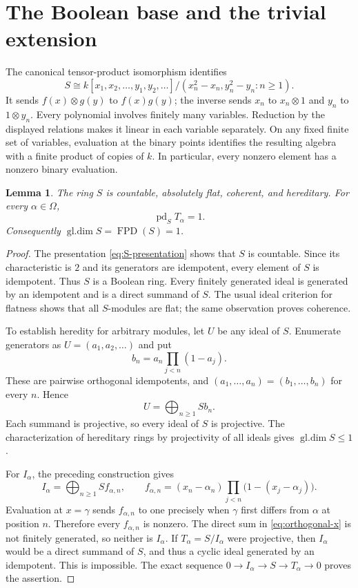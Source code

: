\documentclass[11pt]{amsart}
\newtheorem{lemma}[theorem]{Lemma}
\theoremstyle{definition}
\DeclareMathOperator{\FPD}{FPD}
\DeclareMathOperator{\pd}{pd}
\DeclareMathOperator{\gldim}{gl.dim}
\numberwithin{equation}{section}
\begin{document}
\section{The Boolean base and the trivial extension}

The canonical tensor-product isomorphism identifies
\begin{equation}\label{eq:S-presentation}
 S\cong k[x_1,x_2,\ldots,y_1,y_2,\ldots]/
 (x_n^2-x_n,y_n^2-y_n:n\geq1).
\end{equation}
It sends $f(x)\otimes g(y)$ to $f(x)g(y)$; the inverse sends
$x_n$ to $x_n\otimes1$ and $y_n$ to $1\otimes y_n$.
Every polynomial involves finitely many variables. Reduction by the
displayed relations makes it linear in each variable separately.
On any fixed finite set of variables, evaluation at the binary points
identifies the resulting algebra with a finite product of copies of
$k$. In particular, every nonzero element has a nonzero binary
evaluation.

\begin{lemma}\label{lem:hereditary}
The ring $S$ is countable, absolutely flat, coherent, and hereditary.
For every $\alpha\in\Omega$,
\[
 \pd_S T_\alpha=1.
\]
Consequently $\gldim S=\FPD(S)=1$.
\end{lemma}

\begin{proof}
The presentation \eqref{eq:S-presentation} shows that $S$ is countable.
Since its characteristic is $2$ and its generators are idempotent,
every element of $S$ is idempotent. Thus $S$ is a Boolean ring. Every
finitely generated ideal is generated by an idempotent and is a direct
summand of $S$. The usual ideal criterion for flatness shows that all
$S$-modules are flat; the same observation proves coherence.

To establish heredity for arbitrary modules, let $U$ be any ideal of
$S$. Enumerate generators as $U=(a_1,a_2,\ldots)$ and put
\[
 b_n=a_n\prod_{j<n}(1-a_j).
\]
These are pairwise orthogonal idempotents, and
$(a_1,\ldots,a_n)=(b_1,\ldots,b_n)$ for every $n$. Hence
\[
 U=\bigoplus_{n\geq1}Sb_n.
\]
Each summand is projective, so every ideal of $S$ is projective.
The characterization of hereditary rings by projectivity of all
ideals gives $\gldim S\leq1$.

For $I_\alpha$, the preceding construction gives
\begin{equation}\label{eq:orthogonal-x}
 I_\alpha=\bigoplus_{n\geq1}Sf_{\alpha,n},\qquad
 f_{\alpha,n}=(x_n-\alpha_n)
       \prod_{j<n}\bigl(1-(x_j-\alpha_j)\bigr).
\end{equation}
Evaluation at $x=\gamma$ sends $f_{\alpha,n}$ to one precisely when
$\gamma$ first differs from $\alpha$ at position $n$. Therefore every
$f_{\alpha,n}$ is nonzero. The direct sum in
\eqref{eq:orthogonal-x} is not finitely generated, so neither is
$I_\alpha$. If $T_\alpha=S/I_\alpha$ were projective, then $I_\alpha$
would be a direct summand of $S$, and thus a cyclic ideal generated
by an idempotent. This is impossible. The exact sequence
$0\to I_\alpha\to S\to T_\alpha\to0$ proves the assertion.
\end{proof}
\end{document}
